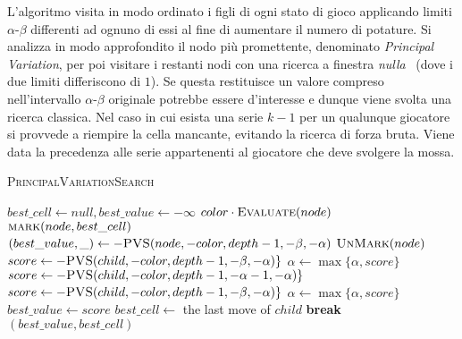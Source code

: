\documentclass{article}
\begin{document}
L'algoritmo visita in modo ordinato i figli di ogni stato di gioco applicando
limiti $\alpha$-$\beta$ differenti ad ognuno di essi al fine di aumentare il numero di potature.
Si analizza in modo approfondito il nodo pi\`u promettente, denominato \emph{Principal
Variation}, per poi visitare i restanti nodi con una ricerca a finestra \emph{nulla}~\cite{scout}
(dove i due limiti differiscono di $1$). Se questa restituisce un valore compreso
nell'intervallo $\alpha$-$\beta$ originale potrebbe essere d'interesse e dunque viene
svolta una ricerca classica.
Nel caso in cui esista una serie $k-1$ per un qualunque giocatore si provvede a
riempire la cella mancante, evitando la ricerca di forza bruta. Viene data la
precedenza alle serie appartenenti al giocatore che deve svolgere la mossa.

\begin{algorithm}[H]
  \caption{\textsc{PrincipalVariationSearch}}
  \label{alg:pvs}
  \begin{algorithmic}[0]
      \State $best\_cell \gets null, best\_value \gets -\infty$
        \State \Return $color \cdot \Call{Evaluate}{node}$
        \State $\Call{mark}{node, best\_cell}$
        \State $(best\_value, \_) \gets -\Call{PVS}{node, -color, depth-1, -\beta, -\alpha}$
        \State $\Call{UnMark}{node}$
      \Else
            \State $score \gets -\Call{PVS}{child, -color, depth-1, -\beta, -\alpha}\}$
            \State $\alpha \gets \max\{\alpha, score\}$
          \Else
            \State $score \gets -\Call{PVS}{child, -color, depth-1, -\alpha-1, -\alpha}\}$
              \State $score \gets -\Call{PVS}{child, -color, depth-1, -\beta, -\alpha}\}$
              \State $\alpha \gets \max\{\alpha, score\}$
            \EndIf
          \EndIf
            \State $best\_value \gets score$
            \State $best\_cell \gets $ the last move of $child$
          \EndIf
            \State \textbf{break}
          \EndIf
        \EndFor
      \EndIf
      \State \Return $(best\_value, best\_cell)$
    \EndProcedure
  \end{algorithmic}
\end{algorithm}
\end{document}
